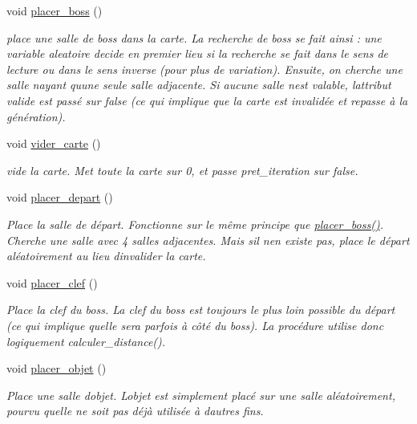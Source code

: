 \begin{DoxyCompactItemize}
void \hyperlink{classZoneGen_a2e14ba96367ade514d250c4ae1aa5025}{placer\+\_\+boss} ()
\begin{DoxyCompactList}\small\item\em place une salle de boss dans la {\itshape carte}. La recherche de boss se fait ainsi \+: une variable aleatoire decide en premier lieu si la recherche se fait dans le sens de lecture ou dans le sens inverse (pour plus de variation). Ensuite, on cherche une salle n\textquotesingle{}ayant qu\textquotesingle{}une seule salle adjacente. Si aucune salle n\textquotesingle{}est valable, l\textquotesingle{}attribut {\itshape valide} est passé sur false (ce qui implique que la carte est invalidée et repasse à la génération). \end{DoxyCompactList}\item 
void \hyperlink{classZoneGen_ab288110fafd009f569ab27d65d35b3ed}{vider\+\_\+carte} ()
\begin{DoxyCompactList}\small\item\em vide la {\itshape carte}. Met toute la {\itshape carte} sur 0, et passe {\itshape pret\+\_\+iteration} sur false. \end{DoxyCompactList}\item 
void \hyperlink{classZoneGen_aadf5a70af191ddd5f5875878831a5b63}{placer\+\_\+depart} ()
\begin{DoxyCompactList}\small\item\em Place la salle de départ. Fonctionne sur le même principe que \hyperlink{classZoneGen_a2e14ba96367ade514d250c4ae1aa5025}{placer\+\_\+boss()}. Cherche une salle avec 4 salles adjacentes. Mais s\textquotesingle{}il n\textquotesingle{}en existe pas, place le départ aléatoirement au lieu d\textquotesingle{}invalider la carte. \end{DoxyCompactList}\item 
void \hyperlink{classZoneGen_a14f00aefb1e1c0a33bddeda26c9168ca}{placer\+\_\+clef} ()
\begin{DoxyCompactList}\small\item\em Place la clef du boss. La clef du boss est toujours le plus loin possible du départ (ce qui implique qu\textquotesingle{}elle sera parfois à côté du boss). La procédure utilise donc logiquement calculer\+\_\+distance(). \end{DoxyCompactList}\item 
void \hyperlink{classZoneGen_a56263320aa237d125e4737c21a4c6fa6}{placer\+\_\+objet} ()
\begin{DoxyCompactList}\small\item\em Place une salle d\textquotesingle{}objet. L\textquotesingle{}objet est simplement placé sur une salle aléatoirement, pourvu qu\textquotesingle{}elle ne soit pas déjà utilisée à d\textquotesingle{}autres fins. \end{DoxyCompactList}\end{DoxyCompactItemize}


